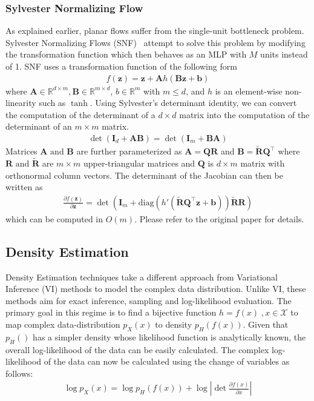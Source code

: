 \documentclass[runningheads]{llncs}
\begin{document}
\subsubsection{Sylvester Normalizing Flow} As explained earlier, planar flows suffer from the single-unit bottleneck problem. Sylvester Normalizing Flows (SNF)~\cite{van2018sylvester} attempt to solve this problem by modifying the transformation function which then behaves as an MLP with $M$ units instead of 1. SNF uses a transformation function of the following form 
\begin{align}
f(\mathbf{z}) = \mathbf{z} + \mathbf{A}h(\mathbf{B}\mathbf{z} + \mathbf{b})
\label{eq:sylfn}
\end{align}
where $\mathbf{A} \in \mathbb{R}^{d\times m},\mathbf{B} \in \mathbb{R}^{m \times d}$, $b \in \mathbb{R}^{m}$ with $m \leq d$, and $h$ is an element-wise non-linearity such as $\tanh$. Using Sylvester's determinant identity, we can convert the computation of the determinant of a $d \times d$ matrix into the computation of the determinant of an $m \times m$ matrix. 
\begin{align}
\det(\mathbf{I}_d + \mathbf{A}\mathbf{B}) = \det(\mathbf{I}_m + \mathbf{B}\mathbf{A})
\end{align}
Matrices $\mathbf{A}\text{ and }\mathbf{B}$ are further parameterized as $\mathbf{A} = \mathbf{Q}\mathbf{R}$ and $\mathbf{B} = \mathbf{\tilde{R}}\mathbf{Q}^\top$ where $\mathbf{R}\text{ and }\mathbf{\tilde{R}}$ are $m\times m$ upper-triangular matrices and $\mathbf{Q}$ is $d \times m $ matrix with orthonormal column vectors. The determinant of the Jacobian can then be written as
\begin{align}
\frac{\partial f(\mathbf{z})}{\partial \mathbf{z}} = \det \left(\mathbf{I}_m + \mathrm{diag}\left(h'(\mathbf{\tilde{R}}\mathbf{Q}^\top\mathbf{z} + \mathbf{b})\right)\mathbf{\tilde{R}}\mathbf{R}\right)
\end{align}
which can be computed in $O(m)$. Please refer to the original paper for details.

\subsection{Density Estimation}
Density Estimation techniques take a different approach from Variational Inference (VI) methods to model the complex data distribution. Unlike VI, these methods aim for exact inference, sampling and log-likelihood evaluation. The primary goal in this regime is to find a bijective function $h=f(x)\;,x \in \mathcal{X}$ to map complex data-distribution $p_X(x)$ to density $p_H(f(x))$. Given that $p_H()$ has a simpler density whose likelihood function is analytically known, the overall log-likelihood of the data can be easily calculated. The complex log-likelihood of the data can now be calculated using the change of variables as follows:
\begin{align}
\log p_X(x)  = \log p_H(f(x)) +
\log\left| \det\frac{\partial f(x)}{\partial x} \right| \label{eq:log-likelihood}
\end{align}
\end{document}
